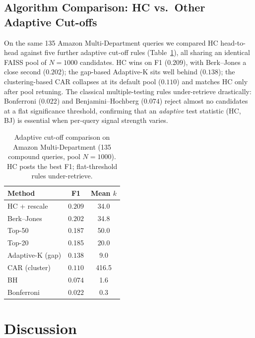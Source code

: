 \documentclass[letterpaper]{article}
\newcommand{\AlgHCF}{0.209}
\newcommand{\AlgBJF}{0.202}
\newcommand{\AlgBonfF}{0.022}
\newcommand{\AlgBHF}{0.074}
\newcommand{\AlgAdaKF}{0.138}
\newcommand{\AlgCARF}{0.110}
\begin{document}
\subsection{Algorithm Comparison: HC vs.\ Other Adaptive Cut-offs}
\label{sec:algcomp}
On the same 135 Amazon Multi-Department queries we compared HC
head-to-head against five further adaptive cut-off rules
(Table~\ref{tab:algcomp}), all sharing an identical FAISS pool of
$N{=}1000$ candidates. HC wins on F1 ($\AlgHCF$), with
Berk--Jones a close second ($\AlgBJF$); the gap-based Adaptive-K
\cite{adaptivek2025} sits well behind ($\AlgAdaKF$); the
clustering-based CAR \cite{xu2025car} collapses at its default
pool ($\AlgCARF$) and matches HC only after pool retuning. The
classical multiple-testing rules under-retrieve drastically:
Bonferroni ($\AlgBonfF$) and Benjamini--Hochberg ($\AlgBHF$)
reject almost no candidates at a flat significance threshold,
confirming that an \emph{adaptive} test statistic (HC, BJ) is
essential when per-query signal strength varies.

\begin{table}[t]
\centering
\small
\begin{tabular}{lcc}
\hline
Method & F1 & Mean $k$ \\
\hline
HC + rescale     & $\AlgHCF$    & 34.0 \\
Berk--Jones      & $\AlgBJF$    & 34.8 \\
Top-50           & 0.187        & 50.0 \\
Top-20           & 0.185        & 20.0 \\
Adaptive-K (gap) & $\AlgAdaKF$  & 9.0 \\
CAR (cluster)    & $\AlgCARF$   & 416.5 \\
BH               & $\AlgBHF$    & 1.6 \\
Bonferroni       & $\AlgBonfF$  & 0.3 \\
\hline
\end{tabular}
\caption{Adaptive cut-off comparison on Amazon Multi-Department
(135 compound queries, pool $N{=}1000$). HC posts the best F1;
flat-threshold rules under-retrieve.}
\label{tab:algcomp}
\end{table}

\section{Discussion}
\end{document}

